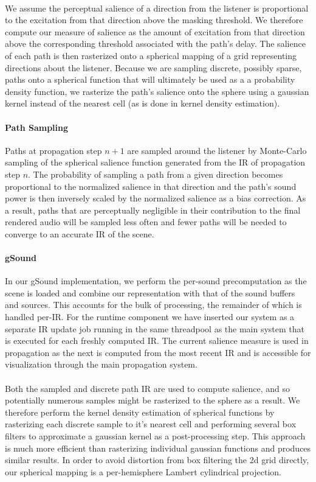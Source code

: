 \paragraph{}
We assume the perceptual salience of a direction from the listener is proportional to the excitation from that direction
above the masking threshold.
We therefore compute our measure of salience as the amount of excitation from that direction above 
the corresponding threshold associated with the path's delay.
The salience of each path is then rasterized onto a spherical mapping of a grid representing directions about the 
listener. 
Because we are sampling discrete, possibly sparse, paths onto a spherical function that will ultimately be used as a 
a probability density function, we rasterize the path's salience onto the sphere using a gaussian kernel 
instead of the nearest cell (as is done in kernel density estimation).
\paragraph{Path Sampling}
Paths at propagation step $n+1$ are sampled around the listener by Monte-Carlo sampling of the 
spherical salience function generated from the IR of propagation step $n$.
The probability of sampling a path from a given direction becomes proportional to the normalized 
salience in that direction and the path's sound power is then inversely scaled by the normalized 
salience as a bias correction.
As a result, paths that are perceptually negligible in their contribution to the final rendered audio 
will be sampled less often and fewer paths will be needed to converge to an accurate IR of the scene.
\paragraph{gSound}
In our gSound implementation, we perform the per-sound precomputation as the scene is loaded and combine our 
representation with that of the sound buffers and sources.
This accounts for the bulk of processing, the remainder of which is handled per-IR.
For the runtime component we have inserted our system as a separate IR update job running in the same threadpool
as the main system that is executed for each freshly computed IR.
The current salience measure is used in propagation as the next is computed from the most recent IR and is accessible 
for visualization through the main propagation system.
\paragraph{}
Both the sampled and discrete path IR are used to compute salience, and so potentially numerous samples might be 
rasterized to the sphere as a result.
We therefore perform the kernel density estimation of spherical functions by rasterizing each discrete sample to it's 
nearest cell and performing several box filters to approximate a gaussian kernel as a post-processing step.
This approach is much more efficient than rasterizing individual gaussian functions and produces similar results.
In order to avoid distortion from box filtering the 2d grid directly, our spherical mapping is a per-hemisphere 
Lambert cylindrical projection.
